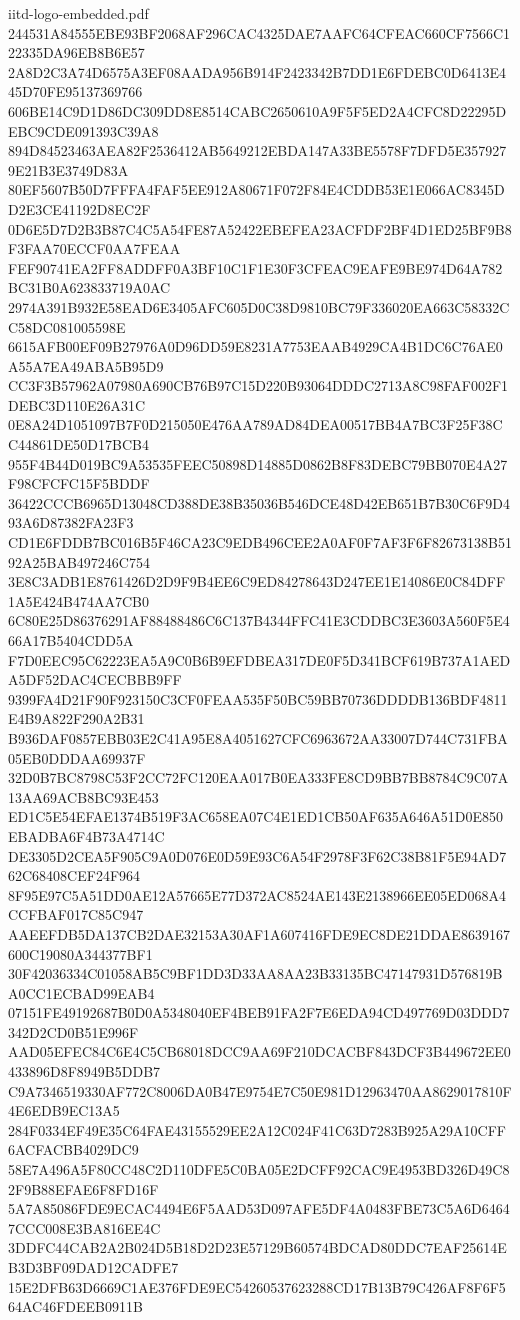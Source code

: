 \begin{filecontents*}[overwrite]{iitd-logo-embedded.pdf}
244531A84555EBE93BF2068AF296CAC4325DAE7AAFC64CFEAC660CF7566C122335DA96EB8B6E57
2A8D2C3A74D6575A3EF08AADA956B914F2423342B7DD1E6FDEBC0D6413E445D70FE95137369766
606BE14C9D1D86DC309DD8E8514CABC2650610A9F5F5ED2A4CFC8D22295DEBC9CDE091393C39A8
894D84523463AEA82F2536412AB5649212EBDA147A33BE5578F7DFD5E3579279E21B3E3749D83A
80EF5607B50D7FFFA4FAF5EE912A80671F072F84E4CDDB53E1E066AC8345DD2E3CE41192D8EC2F
0D6E5D7D2B3B87C4C5A54FE87A52422EBEFEA23ACFDF2BF4D1ED25BF9B8F3FAA70ECCF0AA7FEAA
FEF90741EA2FF8ADDFF0A3BF10C1F1E30F3CFEAC9EAFE9BE974D64A782BC31B0A623833719A0AC
2974A391B932E58EAD6E3405AFC605D0C38D9810BC79F336020EA663C58332CC58DC081005598E
6615AFB00EF09B27976A0D96DD59E8231A7753EAAB4929CA4B1DC6C76AE0A55A7EA49ABA5B95D9
CC3F3B57962A07980A690CB76B97C15D220B93064DDDC2713A8C98FAF002F1DEBC3D110E26A31C
0E8A24D1051097B7F0D215050E476AA789AD84DEA00517BB4A7BC3F25F38CC44861DE50D17BCB4
955F4B44D019BC9A53535FEEC50898D14885D0862B8F83DEBC79BB070E4A27F98CFCFC15F5BDDF
36422CCCB6965D13048CD388DE38B35036B546DCE48D42EB651B7B30C6F9D493A6D87382FA23F3
CD1E6FDDB7BC016B5F46CA23C9EDB496CEE2A0AF0F7AF3F6F82673138B5192A25BAB497246C754
3E8C3ADB1E8761426D2D9F9B4EE6C9ED84278643D247EE1E14086E0C84DFF1A5E424B474AA7CB0
6C80E25D86376291AF88488486C6C137B4344FFC41E3CDDBC3E3603A560F5E466A17B5404CDD5A
F7D0EEC95C62223EA5A9C0B6B9EFDBEA317DE0F5D341BCF619B737A1AEDA5DF52DAC4CECBBB9FF
9399FA4D21F90F923150C3CF0FEAA535F50BC59BB70736DDDDB136BDF4811E4B9A822F290A2B31
B936DAF0857EBB03E2C41A95E8A4051627CFC6963672AA33007D744C731FBA05EB0DDDAA69937F
32D0B7BC8798C53F2CC72FC120EAA017B0EA333FE8CD9BB7BB8784C9C07A13AA69ACB8BC93E453
ED1C5E54EFAE1374B519F3AC658EA07C4E1ED1CB50AF635A646A51D0E850EBADBA6F4B73A4714C
DE3305D2CEA5F905C9A0D076E0D59E93C6A54F2978F3F62C38B81F5E94AD762C68408CEF24F964
8F95E97C5A51DD0AE12A57665E77D372AC8524AE143E2138966EE05ED068A4CCFBAF017C85C947
AAEEFDB5DA137CB2DAE32153A30AF1A607416FDE9EC8DE21DDAE8639167600C19080A344377BF1
30F42036334C01058AB5C9BF1DD3D33AA8AA23B33135BC47147931D576819BA0CC1ECBAD99EAB4
07151FE49192687B0D0A5348040EF4BEB91FA2F7E6EDA94CD497769D03DDD7342D2CD0B51E996F
AAD05EFEC84C6E4C5CB68018DCC9AA69F210DCACBF843DCF3B449672EE0433896D8F8949B5DDB7
C9A7346519330AF772C8006DA0B47E9754E7C50E981D12963470AA8629017810F4E6EDB9EC13A5
284F0334EF49E35C64FAE43155529EE2A12C024F41C63D7283B925A29A10CFF6ACFACBB4029DC9
58E7A496A5F80CC48C2D110DFE5C0BA05E2DCFF92CAC9E4953BD326D49C82F9B88EFAE6F8FD16F
5A7A85086FDE9ECAC4494E6F5AAD53D097AFE5DF4A0483FBE73C5A6D64647CCC008E3BA816EE4C
3DDFC44CAB2A2B024D5B18D2D23E57129B60574BDCAD80DDC7EAF25614EB3D3BF09DAD12CADFE7
15E2DFB63D6669C1AE376FDE9EC54260537623288CD17B13B79C426AF8F6F564AC46FDEEB0911B

\end{filecontents*}

